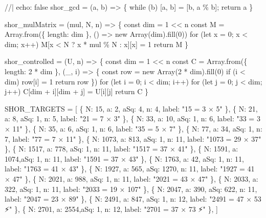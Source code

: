 \documentclass[
  11pt,
  letterpaper,
  oneside]{scrbook}
\newenvironment{Shaded}{\begin{snugshade}}{\end{snugshade}}
\newcommand{\NormalTok}[1]{\textcolor[rgb]{0.00,0.23,0.31}{#1}}
\begin{document}
\begin{Shaded}
\begin{Highlighting}[]
\NormalTok{//| echo: false}
\NormalTok{shor\_gcd = (a, b) =\textgreater{} \{ while (b) [a, b] = [b, a \% b]; return a \}}

\NormalTok{shor\_mulMatrix = (mul, N, n) =\textgreater{} \{}
\NormalTok{  const dim = 1 \textless{}\textless{} n}
\NormalTok{  const M = Array.from(\{ length: dim \}, () =\textgreater{} new Array(dim).fill(0))}
\NormalTok{  for (let x = 0; x \textless{} dim; x++) M[x \textless{} N ? x * mul \% N : x][x] = 1}
\NormalTok{  return M}
\NormalTok{\}}

\NormalTok{shor\_controlled = (U, n) =\textgreater{} \{}
\NormalTok{  const dim = 1 \textless{}\textless{} n}
\NormalTok{  const C = Array.from(\{ length: 2 * dim \}, (\_, i) =\textgreater{} \{}
\NormalTok{    const row = new Array(2 * dim).fill(0)}
\NormalTok{    if (i \textless{} dim) row[i] = 1}
\NormalTok{    return row}
\NormalTok{  \})}
\NormalTok{  for (let i = 0; i \textless{} dim; i++)}
\NormalTok{    for (let j = 0; j \textless{} dim; j++)}
\NormalTok{      C[dim + i][dim + j] = U[i][j]}
\NormalTok{  return C}
\NormalTok{\}}

\NormalTok{SHOR\_TARGETS = [}
\NormalTok{  \{ N: 15,   a: 2,   aSq: 4,    n: 4,  label: "15 = 3 × 5" \},}
\NormalTok{  \{ N: 21,   a: 8,   aSq: 1,    n: 5,  label: "21 = 7 × 3" \},}
\NormalTok{  \{ N: 33,   a: 10,  aSq: 1,    n: 6,  label: "33 = 3 × 11" \},}
\NormalTok{  \{ N: 35,   a: 6,   aSq: 1,    n: 6,  label: "35 = 5 × 7" \},}
\NormalTok{  \{ N: 77,   a: 34,  aSq: 1,    n: 7,  label: "77 = 7 × 11" \},}
\NormalTok{  \{ N: 1073, a: 813, aSq: 1,    n: 11, label: "1073 = 29 × 37" \},}
\NormalTok{  \{ N: 1517, a: 778, aSq: 1,    n: 11, label: "1517 = 37 × 41" \},}
\NormalTok{  \{ N: 1591, a: 1074,aSq: 1,    n: 11, label: "1591 = 37 × 43" \},}
\NormalTok{  \{ N: 1763, a: 42,  aSq: 1,    n: 11, label: "1763 = 41 × 43" \},}
\NormalTok{  \{ N: 1927, a: 565, aSq: 1270, n: 11, label: "1927 = 41 × 47" \},}
\NormalTok{  \{ N: 2021, a: 988, aSq: 1,    n: 11, label: "2021 = 43 × 47" \},}
\NormalTok{  \{ N: 2033, a: 322, aSq: 1,    n: 11, label: "2033 = 19 × 107" \},}
\NormalTok{  \{ N: 2047, a: 390, aSq: 622,  n: 11, label: "2047 = 23 × 89" \},}
\NormalTok{  \{ N: 2491, a: 847, aSq: 1,    n: 12, label: "2491 = 47 × 53 ⚡" \},}
\NormalTok{  \{ N: 2701, a: 2554,aSq: 1,    n: 12, label: "2701 = 37 × 73 ⚡" \},}
\NormalTok{]}
\end{Highlighting}
\end{Shaded}
\end{document}
